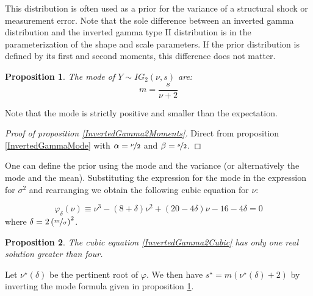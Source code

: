\documentclass{amsart}
\theoremstyle{plain}
\newtheorem{proposition}{Proposition}[section]
\theoremstyle{remark}
\numberwithin{equation}{section}
\begin{document}
This distribution is often used as a prior for the variance of a structural shock
or measurement error. Note that the sole difference between an inverted gamma
distribution and the inverted gamma type II distribution is in the parameterization of the
shape and scale parameters. If the prior distribution is defined by its first and
second moments, this difference does not matter.\newline

\begin{proposition}\label{InvertedGamma2Mode}
  The mode of $Y\sim IG_2(\nu, s)$ are:
  \[
    m = \frac{s}{\nu+2}
  \]
\end{proposition}

Note that the mode is strictly positive and smaller than the expectation.

\begin{proof}[Proof of proposition \ref{InvertedGamma2Moments}]
  Direct from proposition \ref{InvertedGammaMode} with $\alpha=\nicefrac{\nu}{2}$ and $\beta=\nicefrac{s}{2}$. 
\end{proof}

One can define the prior using the mode and the variance (or alternatively the
mode and the mean). Substituting the expression for the mode in the expression
for $\sigma^2$ and rearranging we obtain the following cubic equation for $\nu$:

\begin{equation}\label{InvertedGamma2Cubic}
\varphi_{\delta}(\nu) \equiv \nu^3 - (8+\delta)\nu^2 + (20-4\delta)\nu - 16 -4\delta = 0 
\end{equation}
where $\delta = 2\left(\nicefrac{m}{\sigma}\right)^2$.

\begin{proposition}\label{InvertedGamma2SolveCubic}
  The cubic equation \eqref{InvertedGamma2Cubic} has only one real solution greater than four.
\end{proposition}

Let $\nu^{\star}(\delta)$ be the pertinent root of $\varphi$. We then have $s^{\star} = m(\nu^{\star}(\delta)+2)$ by inverting
the mode formula given in proposition \ref{InvertedGamma2Mode}.
\end{document}
